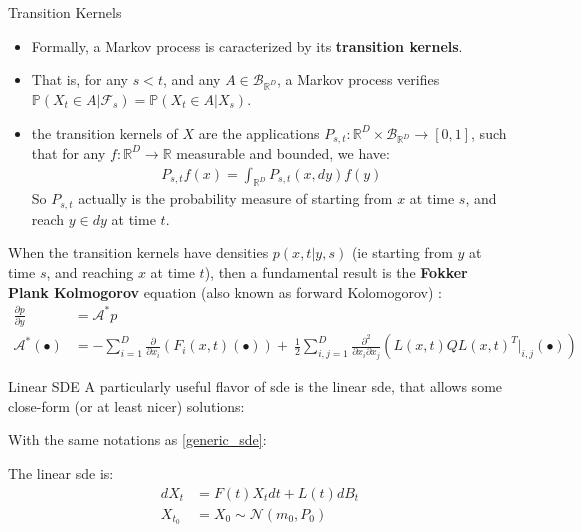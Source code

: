\begin{frame}{Transition Kernels}
    \begin{itemize}
        \item Formally, a Markov process is caracterized by its \textbf{transition kernels}. 
        \item That is, for any $s < t$, and any $A \in \mathcal{B}_{\mathbb{R}^{D}}$, a Markov process verifies 
$\mathbb{P}(X_t \in A \vert \mathcal{F}_s) = \mathbb{P}(X_t \in A \vert X_s)$.
        \item the transition kernels of $X$ are the applications $P_{s,t} : \mathbb{R}^{D} \times \mathcal{B}_{\mathbb{R}^{D}} \rightarrow [0,1]$, 
            such that for any $f : \mathbb{R}^{D} \rightarrow \mathbb{R}$ measurable and bounded, we have:
            \begin{align}
                P_{s,t}f(x) = \int_{{\mathbb{R}^{D}}} P_{s,t}(x,dy) f(y)
            \end{align}
        So $P_{s,t}$ actually is the probability measure of starting from $x$ at time $s$, and reach $y \in dy$ at time $t$.
    \end{itemize}
    
When the transition kernels have densities $p(x,t \vert y,s)$ (ie starting from $y$ at time $s$, and
reaching $x$ at time $t$), then a fundamental result is the \textbf{Fokker Plank Kolmogorov} equation 
(also known as forward Kolomogorov) :
\begin{align}
    \label{FPK}
    \frac{\partial p}{\partial y} &= \mathcal{A}^{*}p \\
    \mathcal{A}^{*}(\bullet) &= - \sum_{i=1}^{D} \frac{\partial}{\partial x_i} (F_i(x,t)(\bullet)) + \
        \frac{1}{2} \sum_{i,j=1}^{D} \frac{\partial^{2}}{\partial x_i \partial x_j} (L(x,t)QL(x,t)^{T}\vert_{i,j} (\bullet))
\end{align}
\end{frame}

\begin{frame}{Linear SDE}
    A particularly useful flavor of \gls{sde} is the linear \gls{sde}, that allows some close-form (or at least nicer) solutions:

    \begin{definition}
        With the same notations as \ref{generic_sde}:

        The linear \gls{sde} is:
        \begin{align}
            \label{linear_sde}
            dX_t &= F(t) X_t dt + L(t) dB_t \\
            X_{t_0} &= X_0 \sim \mathcal{N}(m_0, P_0)
        \end{align}
    \end{definition}
\end{frame}

